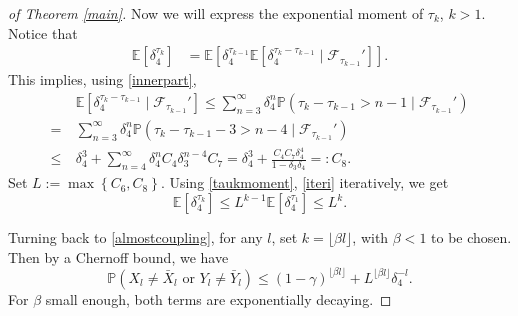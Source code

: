 \documentclass{article}
\def\mE{\mathbb{E}}
\def\mP{\mathbb{P}}
\begin{document}
\begin{proof}[of Theorem \ref{main}]
Now we will express the exponential moment of $\tau_k$, $k>1$. Notice that
\begin{align}
\label{taukmoment}
    \mE[\delta_4^{\tau_k}]&= 
    \mE[\delta_4^{\tau_{k-1}}
    \mE[\delta_4^{\tau_k-\tau_{k-1}}\mid \mathcal{F}_{\tau_{k-1}}']].
\end{align}
%
%
This implies, using \eqref{innerpart},
  \begin{align}
&\mE[\delta_4^{\tau_k-\tau_{k-1}}\mid \mathcal{F}_{\tau_{k-1}}'] \leq
\sum_{n=3}^\infty \delta_4^n \mP({\tau_k \!-\! \tau_{k-1}} \!>\! n \!-\! 1\mid \mathcal{F}_{\tau_{k-1}}')\nonumber\\
=~&\sum_{n=3}^\infty \delta_4^n \mP({\tau_k-\tau_{k-1}}-3>n-4\mid \mathcal{F}_{\tau_{k-1}}')  \label{iteri} \\
\leq~& \delta_{4}^{3}+\sum_{n=4}^\infty \delta_4^n C_4\delta_3^{n-4} C_7 =
\delta_{4}^{3}+\frac{C_{4}C_{7}\delta_{4}^{4}}{1-\delta_{3}\delta_{4}}=:C_{8}.    \nonumber
  \end{align}
%
%
Set $L:=\max\left\{C_{6},C_{8}\right\}$.
Using \eqref{taukmoment}, \eqref{iteri} iteratively, we get
\[
\mE[\delta_4^{\tau_k}]\leq L^{k-1}\mE[\delta_4^{\tau_1}]\leq L^k.
\]


Turning back to \eqref{almostcoupling}, for any $l$, set $k=\lfloor \beta l\rfloor$, with $\beta<1$ to be chosen. 
Then by a Chernoff bound, we have
\[
\mathbb{P}(X_{l}\neq \bar{X}_{l}\mbox{ or }Y_{l}\neq\bar{Y}_{l})\leq 
(1-\gamma)^{\lfloor \beta l\rfloor}+L^{\lfloor \beta l\rfloor}\delta_4^{-l}.
\]
For $\beta$ small enough, both terms are exponentially decaying. 


\end{proof}
\end{document}
